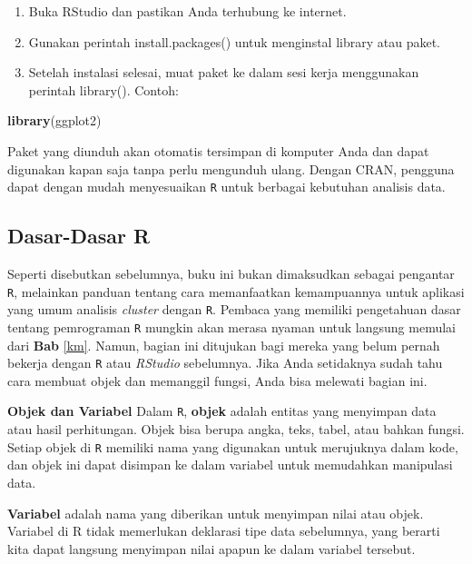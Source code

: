 \documentclass[
  oneside]{book}
\newenvironment{Shaded}{\begin{snugshade}}{\end{snugshade}}
\newcommand{\FunctionTok}[1]{\textcolor[rgb]{0.13,0.29,0.53}{\textbf{#1}}}
\newcommand{\NormalTok}[1]{#1}
\begin{document}
\begin{enumerate}
\def\labelenumi{\arabic{enumi}.}
\item
  Buka RStudio dan pastikan Anda terhubung ke internet.
\item
  Gunakan perintah install.packages() untuk menginstal library atau
  paket.
\item
  Setelah instalasi selesai, muat paket ke dalam sesi kerja
  menggunakan perintah library(). Contoh:
\end{enumerate}

\begin{Shaded}
\begin{Highlighting}[]
\FunctionTok{library}\NormalTok{(ggplot2)}
\end{Highlighting}
\end{Shaded}

Paket yang diunduh akan otomatis tersimpan di komputer Anda dan dapat
digunakan kapan saja tanpa perlu mengunduh ulang. Dengan CRAN, pengguna
dapat dengan mudah menyesuaikan \texttt{R} untuk berbagai kebutuhan
analisis data.

\subsection*{Dasar-Dasar R}\label{dasar-dasar-r}

Seperti disebutkan sebelumnya, buku ini bukan dimaksudkan sebagai
pengantar \texttt{R}, melainkan panduan tentang cara memanfaatkan
kemampuannya untuk aplikasi yang umum analisis \emph{cluster} dengan
\texttt{R}. Pembaca yang memiliki pengetahuan dasar tentang
pemrograman \texttt{R} mungkin akan merasa nyaman untuk langsung
memulai dari \textbf{Bab} \ref{km}. Namun, bagian ini ditujukan bagi mereka
yang belum pernah bekerja dengan \texttt{R} atau \emph{RStudio}
sebelumnya. Jika Anda setidaknya sudah tahu cara membuat objek dan
memanggil fungsi, Anda bisa melewati bagian ini.

\textbf{Objek dan Variabel} Dalam \texttt{R}, \textbf{objek} adalah entitas
yang menyimpan data atau hasil perhitungan. Objek bisa berupa angka,
teks, tabel, atau bahkan fungsi. Setiap objek di \texttt{R}
memiliki nama yang digunakan untuk merujuknya dalam kode, dan objek ini
dapat disimpan ke dalam variabel untuk memudahkan manipulasi data.

\textbf{Variabel} adalah nama yang diberikan untuk menyimpan nilai atau
objek. Variabel di R tidak memerlukan deklarasi tipe data sebelumnya,
yang berarti kita dapat langsung menyimpan nilai apapun ke dalam
variabel tersebut.
\end{document}
